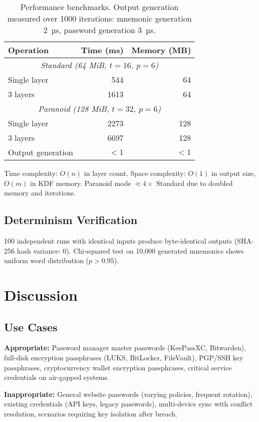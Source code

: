 \documentclass[11pt]{article}
\begin{document}
\begin{table}[H]
\centering
\begin{tabular}{@{}lrr@{}}
\toprule
\textbf{Operation} & \textbf{Time (ms)} & \textbf{Memory (MB)} \\
\midrule
\multicolumn{3}{c}{\textit{Standard (64 MiB, $t=16$, $p=6$)}} \\
Single layer & 544 & 64 \\
3 layers & 1613 & 64 \\
\midrule
\multicolumn{3}{c}{\textit{Paranoid (128 MiB, $t=32$, $p=6$)}} \\
Single layer & 2273 & 128 \\
3 layers & 6697 & 128 \\
\midrule
Output generation & $<1$ & $<1$ \\
\bottomrule
\end{tabular}
\caption{Performance benchmarks. Output generation measured over 1000 iterations: mnemonic generation 2~µs, password generation 3~µs.}
\end{table}

Time complexity: $O(n)$ in layer count. Space complexity: $O(1)$ in output size, $O(m)$ in KDF memory. Paranoid mode $\approx 4\times$ Standard due to doubled memory and iterations.

\subsection{Determinism Verification}

100 independent runs with identical inputs produce byte-identical outputs (SHA-256 hash variance: 0). Chi-squared test on 10,000 generated mnemonics shows uniform word distribution ($p > 0.95$).

\section{Discussion}

\subsection{Use Cases}

\textbf{Appropriate:} Password manager master passwords (KeePassXC, Bitwarden), full-disk encryption passphrases (LUKS, BitLocker, FileVault), PGP/SSH key passphrases, cryptocurrency wallet encryption passphrases, critical service credentials on air-gapped systems.

\textbf{Inappropriate:} General website passwords (varying policies, frequent rotation), existing credentials (API keys, legacy passwords), multi-device sync with conflict resolution, scenarios requiring key isolation after breach.
\end{document}
